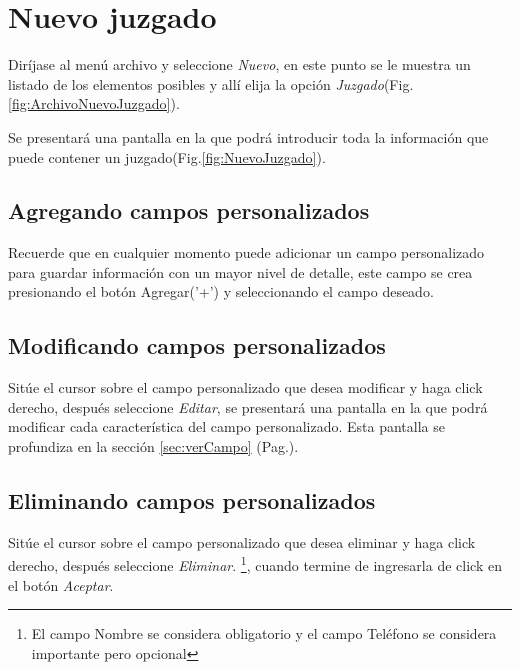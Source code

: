 \section{Nuevo juzgado}
\label{sec:nuevoJuzgado}
Dir\'ijase al men\'u archivo y seleccione \emph{Nuevo}, en este punto se le muestra un listado de los elementos posibles y
all\'i elija la opci\'on \emph{Juzgado}(Fig.\ref{fig:ArchivoNuevoJuzgado}). 
  

Se presentar\'a una pantalla en la que podr\'a introducir toda la informaci\'on
que puede contener un juzgado(Fig.\ref{fig:NuevoJuzgado}). 
  

\subsection{Agregando campos personalizados}
\label{sec:agregarCamposJuzgado}
Recuerde que en cualquier momento puede adicionar un campo personalizado para guardar informaci\'on con un mayor nivel de detalle, este campo se crea presionando el bot\'on Agregar('+') y seleccionando el campo deseado.

\subsection{Modificando campos personalizados}
\label{sec:modificarCamposJuzgado}
Sit\'ue el cursor sobre el campo personalizado que desea modificar y haga click derecho, despu\'es seleccione \emph{Editar},
se presentar\'a una pantalla en la que podr\'a modificar cada caracter\'istica
del campo personalizado. Esta pantalla se profundiza en la secci\'on
\ref{sec:verCampo} (Pag.\pageref{sec:verCampo}).

\subsection{Eliminando campos personalizados}
\label{sec:eliminarCamposJuzgado}
Sit\'ue el cursor sobre el campo personalizado que desea eliminar y haga click derecho, despu\'es seleccione \emph{Eliminar}.
\footnote{El campo Nombre se considera obligatorio y el campo Tel\'efono se
considera importante pero opcional},
cuando termine de ingresarla de click en el bot\'on \emph{Aceptar}.